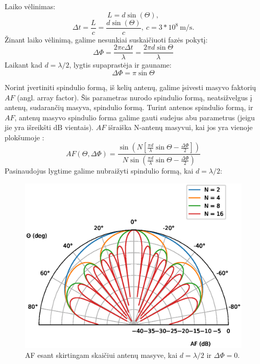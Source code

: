 \documentclass[main.tex]{subfiles}
\begin{document}
Laiko vėlinimas:
\begin{equation}
    L = d\sin(\Theta),
\end{equation}
\begin{equation}
    \Delta t = \frac{L}{c}=\frac{d\sin(\Theta)}{c},\ c = 3 * 10^8\ \mathrm{m/s}.
\end{equation}
Žinant laiko vėlinimą, galime nesunkiai suskaičiuoti fazės pokytį:
\begin{equation}
    \Delta \Phi = \frac{2\pi c \Delta t}{\lambda} = \frac{2\pi d \sin{\Theta}}{\lambda}
    \label{eq:phase_shift}
\end{equation}
Laikant kad $d = \lambda / 2$,  lygtis supaprastėja ir gauname:
\begin{equation}
    \Delta \Phi = \pi \sin{\Theta}
\end{equation}

Norint įvertiniti spindulio formą, iš kelių antenų, galime įsivesti masyvo faktorių
$AF$ (angl. array factor). Šis parametras nurodo spindulio formą, neatsižvelgus
į antenų, sudarančių masyva, spindulio formą. Turint antenos spindulio formą,
ir $AF$, antenų masyvo spindulio forma galime gauti sudejus abu parametrus
(jeigu jie yra išreikšti $\mathrm{dB}$ vientais).
$AF$ išraiška N-antenų masyvui, kai jos yra vienoje plokšumoje \cite{phase_array_handbook}:
\begin{equation}
    AF(\Theta,\Delta \Phi) = \frac{\sin{\left( N\left[ \frac{\pi d}{\lambda} \sin{\Theta} - \frac{\Delta \Phi}{2} \right] \right)}}{N \sin{\left( \frac{\pi d}{\lambda}\sin{\Theta}-\frac{\Delta \Phi}{2}\right)}}
    \label{eq:array_factor}
\end{equation}
Pasinaudojus  lygtime galime nubraižyti spindulio formą, kai $d=\lambda /2$:

\begin{figure}[h]
    \begin{centering}
    \includegraphics[scale=0.8]{drawings/af_polar_plot}
    \par\end{centering}
    \protect\caption{\label{fig:af_polar_plot}AF esant skirtingam skaičiui antenų masyve, kai $d=\lambda / 2$ ir $\Delta \Phi = 0$.}
\end{figure}
\end{document}
